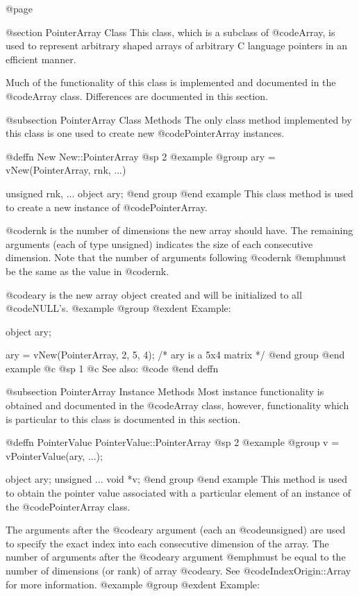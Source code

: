 @page

@section  PointerArray Class
This class, which is a subclass of @code{Array}, is used to represent
arbitrary shaped arrays of arbitrary C language pointers in an efficient
manner.


Much of the functionality of this class is implemented and documented in
the @code{Array} class.  Differences are documented in this section.



@subsection PointerArray Class Methods
The only class method implemented by this class is one used to create
new @code{PointerArray} instances.






@deffn {New} New::PointerArray
@sp 2
@example
@group
ary = vNew(PointerArray, rnk, ...)

unsigned  rnk, ...
object    ary;
@end group
@end example
This class method is used to create a new instance of @code{PointerArray}.

@code{rnk} is the number of dimensions the new array should have.
The remaining arguments (each of type unsigned) indicates the size of
each consecutive dimension.  Note that the number of arguments following
@code{rnk} @emph{must} be the same as the value in @code{rnk}.

@code{ary} is the new array object created and will be initialized to
all @code{NULL}'s.
@example
@group
@exdent Example:

object  ary;

ary = vNew(PointerArray, 2, 5, 4);
/*  ary is a 5x4 matrix  */
@end group
@end example
@c @sp 1
@c See also:  @code{}
@end deffn



@subsection PointerArray Instance Methods
Most instance functionality is obtained and documented in the @code{Array}
class, however, functionality which is particular to this class is documented
in this section.





@deffn {PointerValue} PointerValue::PointerArray
@sp 2
@example
@group
v = vPointerValue(ary, ...);

object    ary;
unsigned  ...
void      *v;
@end group
@end example
This method is used to obtain the pointer value associated with a
particular element of an instance of the @code{PointerArray} class.

The arguments after the @code{ary} argument (each an @code{unsigned})
are used to specify the exact index into each consecutive dimension of
the array.  The number of arguments after the @code{ary} argument
@emph{must} be equal to the number of dimensions (or rank) of array
@code{ary}.  See @code{IndexOrigin::Array} for more information.
@example
@group
@exdent Example:

